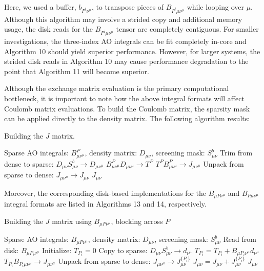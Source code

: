 \noindent Here, we used a buffer, $b_{P^i \nu^{\mu}}$, to transpose pieces of $B_{P^i \mu \nu^{\mu}}$ while looping over $\mu$.
Although this algorithm may involve a strided copy and additional memory usage, the disk reads for the $B_{P^i \mu \nu^{\mu}}$ 
tensor are completely contiguous. 
For smaller investigations, the three-index AO integrals can be fit completely in-core and Algorithm 10 should yield superior 
performance. However, for larger systems,
the strided disk reads in Algorithm 10 may cause performance degradation to the point that Algorithm 11 will become superior.

Although the exchange matrix evaluation is the primary computational bottleneck, it is important to note how the above integral
formats will affect Coulomb matrix evaluations. To build the Coulomb matrix, the sparsity mask can be applied
directly to the density matrix. The following algorithm results:

\begin{algorithm}[H]
\caption{Building the $J$ matrix.}
\begin{algorithmic}
\REQUIRE Sparse AO integrals: $B_{\mu \nu^{\mu}}^P$, density matrix: $D_{\mu \nu}$, screening mask: $S_{\mu \nu}^b$
\STATE Trim from dense to sparse: $D_{\mu \nu}S_{\mu \nu}^b \rightarrow D_{\mu \nu^{\mu} }$
\STATE $B^P_{\mu\nu^{\mu}} D_{\mu \nu^{\mu}} \rightarrow T^{P}$
\STATE $T^{P} B^P_{\mu \nu^{\mu}} \rightarrow J_{\mu \nu^{\mu}} $
\STATE Unpack from sparse to dense: $J_{\mu \nu^{\mu}} \rightarrow J_{\mu \nu}$
\RETURN $J_{\mu \nu}$
\end{algorithmic}
\end{algorithm}

\noindent Moreover, the corresponding disk-based implementations for the $B_{\mu P \nu^\mu}$ and $B_{P \mu \nu^\mu}$ integral
formats are listed in Algorithms 13 and 14, respectively.

\begin{algorithm}[H]
\caption{Building the $J$ matrix using $B_{\mu P \nu^\mu}$, blocking across $P$}
\begin{algorithmic}
\REQUIRE Sparse AO integrals: $B_{\mu P \nu^{\mu}}$, density matrix: $D_{\mu \nu}$, screening mask: $S_{\mu \nu}^b$
    \STATE Read from disk: $B_{\mu P_i \nu^{\mu}}$
    \STATE Initialize: $T_{P_i} = 0$
        \STATE Copy to sparse: $D_{\mu \nu}S_{\mu \nu}^b \rightarrow d_{\nu^{\mu} }$
        \STATE $T_{P_i} = T_{P_i} + B_{\mu P_i \nu^{\mu}}d_{\nu^{\mu}}$
    \ENDFOR    
    \STATE $T_{P_i} B_{P_i \mu \nu^{\mu}} \rightarrow J_{\mu \nu^{\mu}} $
    \STATE Unpack from sparse to dense: $J_{\mu \nu^{\mu}} \rightarrow J_{\mu \nu}^{\{P_i\}}$
    \STATE $J_{\mu \nu} = J_{\mu \nu} + J_{\mu \nu}^{\{P_i\}}$
\ENDFOR
\RETURN $J_{\mu \nu}$
\end{algorithmic}
\end{algorithm}


